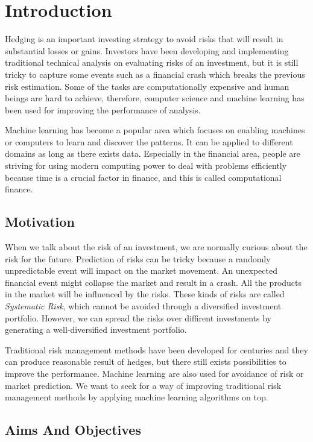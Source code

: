 \documentclass[11pt]{article} %
\theoremstyle{plain}
\theoremstyle{definition}
\begin{document}
\clearpage

\section{Introduction}

Hedging is an important investing strategy to avoid risks that will result in substantial losses or gains. Investors have been developing and implementing traditional technical analysis on evaluating risks of an investment, but it is still tricky to capture some events such as a financial crash which breaks the previous risk estimation. Some of the tasks are computationally expensive and human beings are hard to achieve, therefore, computer science and machine learning has been used for improving the performance of analysis.

Machine learning has become a popular area which focuses on enabling machines or computers to learn and discover the patterns. It can be applied to different domains as long as there exists data. Especially in the financial area, people are striving for using modern computing power to deal with problems efficiently because time is a crucial factor in finance, and this is called computational finance.

\subsection{Motivation}

When we talk about the risk of an investment, we are normally curious about the risk for the future. Prediction of risks can be tricky because a randomly unpredictable event will impact on the market movement. An unexpected financial event might collapse the market and result in a crash. All the products in the market will be influenced by the risks. These kinds of risks are called \textit{Systematic Risk}, which cannot be avoided through a diversified investment portfolio. However, we can spread the risks over diffirent investments by generating a well-diversified investment portfolio.

Traditional risk management methods have been developed for centuries and they can produce reasonable result of hedges, but there still exists possibilities to improve the performance. Machine learning are also used for avoidance of risk or market prediction. We want to seek for a way of improving traditional risk management methods by applying machine learning algorithms on top.

\subsection{Aims And Objectives}
\end{document}
